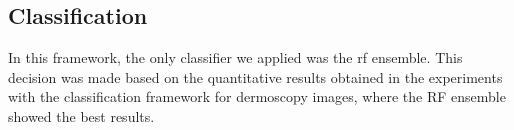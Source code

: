 \subsection{Classification}
In this framework, the only classifier we applied was the \acl{rf} ensemble.
This decision was made based on the quantitative results obtained in the experiments with the classification framework for dermoscopy images, where the RF ensemble showed the best results.
